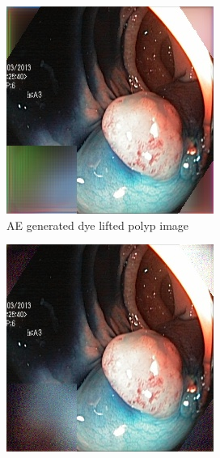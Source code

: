 \begin{figure}
\begin{subfigure}[t]{\myfigsizethree}
            \includegraphics[width=\textwidth]{experiments/figures/both/DLAE.jpg}
            \caption{AE generated dye lifted polyp image}    
            \label{fig:dlp_AE_BOTH2}
        \end{subfigure}
        \qquad
        \begin{subfigure}[t]{\myfigsizethree}  
            \centering 
            \includegraphics[width=\textwidth]{experiments/figures/both/DLGAN.jpg}

\end{subfigure}
\end{figure}
